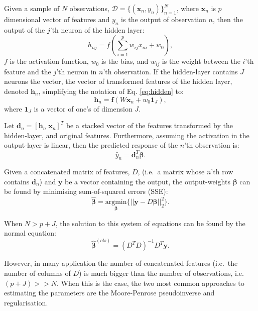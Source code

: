 \documentclass[
]{jss}
\begin{document}
Given a sample of \(N\) observations,
\(\mathcal D = \{(\boldsymbol x_n, y_n)\}_{n = 1}^N\), where
\(\boldsymbol x_n\) is \(p\) dimensional vector of features and \(y_n\)
is the output of observation \(n\), then the output of the \(j\)'th
neuron of the hidden layer: \begin{equation}
h_{nj} = f\left(\sum_{i = 1}^p w_{ij} x_{ni} + w_{0}\right), \label{eq:hidden}
\end{equation} \(f\) is the activation function, \(w_0\) is the bias,
and \(w_{ij}\) is the weight between the \(i\)'th feature and the
\(j\)'th neuron in \(n\)'th observation. If the hidden-layer contains
\(J\) neurons the vector, the vector of transformed features of the
hidden layer, denoted \(\boldsymbol h_{n}\), simplifying the notation of
Eq. \eqref{eq:hidden} to: \begin{equation}
\boldsymbol h_n = \boldsymbol f\left(W \boldsymbol{x}_n + w_0 \boldsymbol{1}_{J}\right),
\end{equation} where \(\boldsymbol{1}_{J}\) is a vector of one's of
dimension \(J\).

Let \(\boldsymbol d_n = [\boldsymbol h_n \; \boldsymbol x_n]^T\) be a
stacked vector of the features transformed by the hidden-layer, and
original features. Furthermore, assuming the activation in the
output-layer is linear, then the predicted response of the \(n\)'th
observation is: \begin{equation}
\hat{y}_n = \boldsymbol d^T_n \boldsymbol \beta.
\end{equation}

Given a concatenated matrix of features, \(D\), (i.e.~a matrix whose
\(n\)'th row contains \(\boldsymbol d_n\)) and \(\boldsymbol y\) be a
vector containing the output, the output-weights \(\boldsymbol \beta\)
can be found by minimising sum-of-squared errors (SSE): \begin{equation}
\hat{\boldsymbol{\beta}} = \underset{\boldsymbol{\beta}}{\text{argmin}} \Big\{ || \boldsymbol{y} - D\boldsymbol{\beta}||_2^2\Big\}. \label{eq:ssq}
\end{equation}

When \(N > p + J\), the solution to this system of equations can be
found by the normal equation: \begin{equation}
\hat{\boldsymbol{\beta}}^{(ols)} = (D^T D)^{-1}D^T\boldsymbol{y}. \label{eq:ols}
\end{equation}

However, in many application the number of concatenated features
(i.e.~the number of columns of \(D\)) is much bigger than the number of
observations, i.e.~\((p + J) >> N\). When this is the case, the two most
common approaches to estimating the parameters are the Moore-Penrose
pseudoinverse and regularisation.
\end{document}

